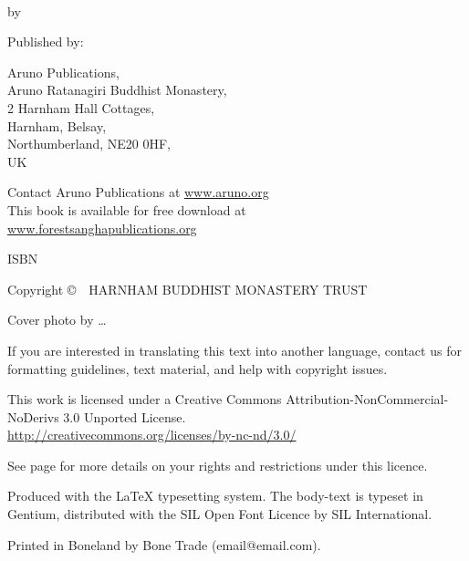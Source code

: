 {\small\setlength{\parskip}{0.8em}\setlength{\parindent}{0em}%
{\raggedright%

\thetitle\\
by \theauthor

Published by:

Aruno Publications,\\
Aruno Ratanagiri Buddhist Monastery,\\
2 Harnham Hall Cottages,\\
Harnham, Belsay,\\
Northumberland, NE20 0HF,\\
UK

Contact Aruno Publications at \href{http://aruno.org}{www.aruno.org}\\
This book is available for free download at\\
\href{http://forestsanghapublications.org/}{www.forestsanghapublications.org}

ISBN \theISBN

Copyright \copyright\ \the\year\ HARNHAM BUDDHIST MONASTERY TRUST

Cover photo by \ldots

\vfill

{\footnotesize
If you are interested in translating this text into another language, contact us for formatting guidelines, text material, and help with copyright issues.

This work is licensed under a Creative Commons Attribution-NonCommercial-NoDerivs 3.0 Unported License.\\
\href{http://creativecommons.org/licenses/by-nc-nd/3.0/}{http://creativecommons.org/licenses/by-nc-nd/3.0/}

See page \pageref{copyright-details} for more details on your rights and restrictions under this licence.

Produced with the {\selectfont\LaTeX} typesetting system. The body-text is typeset in Gentium, distributed with the SIL Open Font Licence by SIL International.

\theEditionInfo

Printed in Boneland by Bone Trade (email@email.com).

}

}}

